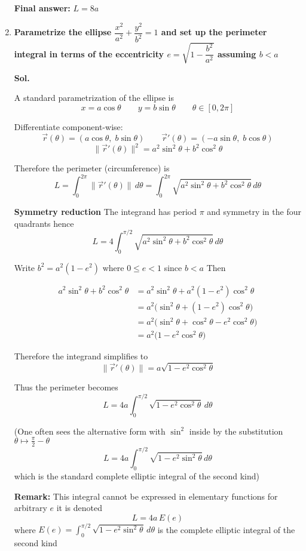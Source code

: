 \documentclass[14pt]{extarticle}
\begin{document}
\begin{enumerate}
\noindent \textbf{Final answer:} $\displaystyle L = 8a$

\newpage
\item \textbf{Parametrize the ellipse $\dfrac{x^2}{a^2}+\dfrac{y^2}{b^2}=1$ and set up the perimeter integral in terms of the eccentricity $e=\sqrt{1-\dfrac{b^2}{a^2}}$ assuming $b<a$}

\textbf{Sol.}

A standard parametrization of the ellipse is
\[
x=a\cos\theta\qquad y=b\sin\theta\qquad \theta\in[0,2\pi]
\]

Differentiate component-wise:
\[
\vec{r}(\theta)=(a\cos\theta,\; b\sin\theta)\qquad
\vec{r}'(\theta)=(-a\sin\theta,\; b\cos\theta)
\]
\[
\|\vec{r}'(\theta)\|^2 = a^2\sin^2\theta + b^2\cos^2\theta
\]

Therefore the perimeter (circumference) is
\[
L=\int_{0}^{2\pi}\|\vec{r}'(\theta)\|\,d\theta
= \int_{0}^{2\pi} \sqrt{a^2\sin^2\theta + b^2\cos^2\theta}\, d\theta
\]

\textbf{Symmetry reduction} The integrand has period $\pi$ and symmetry in the four quadrants hence
\[
L = 4\int_{0}^{\pi/2}\sqrt{a^2\sin^2\theta + b^2\cos^2\theta}\, d\theta
\]

Write $b^2 = a^2(1-e^2)$ where $0\le e<1$ since $b<a$ Then

\begin{align*}
a^2\sin^2\theta + b^2\cos^2\theta
&= a^2\sin^2\theta + a^2(1-e^2)\cos^2\theta \\
&= a^2\bigl(\sin^2\theta + (1-e^2)\cos^2\theta\bigr) \\
&= a^2\bigl(\sin^2\theta + \cos^2\theta - e^2\cos^2\theta\bigr) \\
&= a^2\bigl(1 - e^2\cos^2\theta\bigr)
\end{align*}

Therefore the integrand simplifies to
\[
\|\vec{r}'(\theta)\| = a\sqrt{1 - e^2\cos^2\theta}
\]

Thus the perimeter becomes
\[
\boxed{\,L = 4a\int_{0}^{\pi/2} \sqrt{1 - e^2\cos^2\theta}\, d\theta\, }
\]

(One often sees the alternative form with $\sin^2$ inside by the substitution $\theta\mapsto \tfrac{\pi}{2}-\theta$
\[
\boxed{L = 4a\int_{0}^{\pi/2} \sqrt{1 - e^2\sin^2\theta}\, d\theta}
\]
which is the standard complete elliptic integral of the second kind)

\medskip

\noindent \textbf{Remark:} This integral cannot be expressed in elementary functions for arbitrary $e$ it is denoted
\[
L = 4a\,E(e)
\]
where $E(e)=\int_{0}^{\pi/2}\sqrt{1-e^2\sin^2\theta}\,d\theta$ is the complete elliptic integral of the second kind


\end{enumerate}
\end{document}
